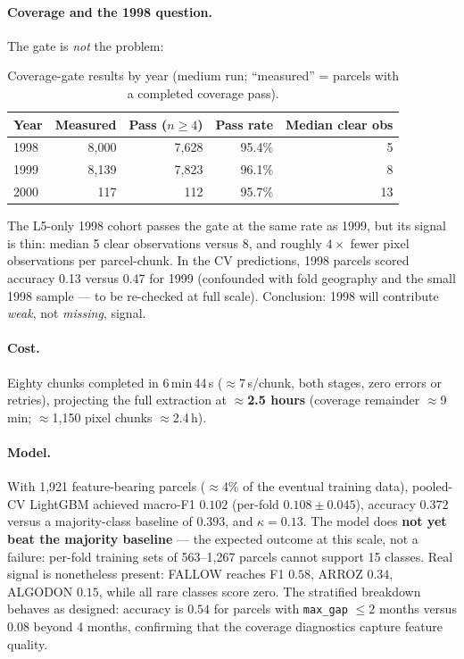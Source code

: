 \documentclass[11pt,a4paper]{article}
\begin{document}
\paragraph{Coverage and the 1998 question.} The gate is \emph{not} the problem:

\begin{table}[ht]
\centering\small
\caption{Coverage-gate results by year (medium run; ``measured'' = parcels with a completed
coverage pass).}
\begin{tabular}{@{}lrrrr@{}}
\toprule
Year & Measured & Pass ($n\geq4$) & Pass rate & Median clear obs \\
\midrule
1998 & 8{,}000 & 7{,}628 & 95.4\% & 5 \\
1999 & 8{,}139 & 7{,}823 & 96.1\% & 8 \\
2000 & 117 & 112 & 95.7\% & 13 \\
\bottomrule
\end{tabular}
\end{table}

\noindent The L5-only 1998 cohort passes the gate at the same rate as 1999, but its signal is
thin: median 5 clear observations versus 8, and roughly $4\times$ fewer pixel observations per
parcel-chunk. In the CV predictions, 1998 parcels scored accuracy 0.13 versus 0.47 for 1999
(confounded with fold geography and the small 1998 sample --- to be re-checked at full scale).
Conclusion: 1998 will contribute \emph{weak}, not \emph{missing}, signal.

\paragraph{Cost.} Eighty chunks completed in 6\,min\,44\,s ($\approx$7\,s/chunk, both stages,
zero errors or retries), projecting the full extraction at \textbf{$\approx$2.5 hours}
(coverage remainder $\approx$9\,min; $\approx$1{,}150 pixel chunks $\approx$2.4\,h).

\paragraph{Model.} With 1{,}921 feature-bearing parcels ($\approx$4\% of the eventual training
data), pooled-CV LightGBM achieved macro-F1 $0.102$ (per-fold $0.108 \pm 0.045$), accuracy
$0.372$ versus a majority-class baseline of $0.393$, and $\kappa = 0.13$. The model does
\textbf{not yet beat the majority baseline} --- the expected outcome at this scale, not a
failure: per-fold training sets of 563--1{,}267 parcels cannot support 15 classes. Real signal
is nonetheless present: FALLOW reaches F1 $0.58$, ARROZ $0.34$, ALGODON $0.15$, while all rare
classes score zero. The stratified breakdown behaves as designed: accuracy is $0.54$ for
parcels with \texttt{max\_gap} $\leq 2$ months versus $0.08$ beyond 4 months, confirming that
the coverage diagnostics capture feature quality.
\end{document}
